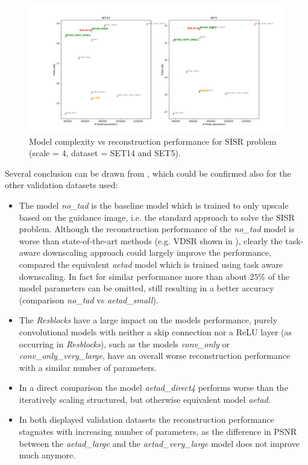 \begin{figure}[!htbp]
	\centering
	\includegraphics[width=18cm]{figures/psnr_complexity_sisr}
	\caption{Model complexity vs reconstruction performance for \ac{SISR}
	problem (scale = 4, dataset = SET14 and SET5).}
  \label{fig:psnr_complexity_sisr}
\end{figure}

Several conclusion can be drawn from , which could be confirmed also for the other validation datasets used:

\begin{itemize}

\item The model \textit{no\_tad} is the baseline model which is trained to only upscale based on the guidance image, i.e. the standard approach to solve the \ac{SISR} problem. Although the reconstruction performance of the \textit{no\_tad} model is worse than state-of-the-art methods (e.g. VDSR \cite{AISRUVDCN} shown in ), clearly the task-aware downscaling approach could largely improve the performance, compared the equivalent \textit{aetad} model which is trained using task aware downscaling. In fact for similar performance more than about $25 \%$ of the model parameters can be omitted, still resulting in a better accuracy (comparison \textit{no\_tad} vs \textit{aetad\_small}).

\item The \textit{Resblocks} have a large impact on the models performance, purely convolutional models with neither a skip connection nor a ReLU layer (as occurring in \textit{Resblocks}), such as the models \textit{conv\_only} or \textit{conv\_only\_very\_large}, have an overall worse reconstruction performance with a similar number of parameters.

\item In a direct comparison the model \textit{aetad\_direct4} performs worse than the iteratively scaling structured, but otherwise equivalent model \textit{aetad}.

\item In both displayed validation datasets the reconstruction performance stagnates with increasing number of parameters, as the difference in \ac{PSNR} between the \textit{aetad\_large} and the \textit{aetad\_very\_large} model does not improve much anymore.
\end{itemize}

